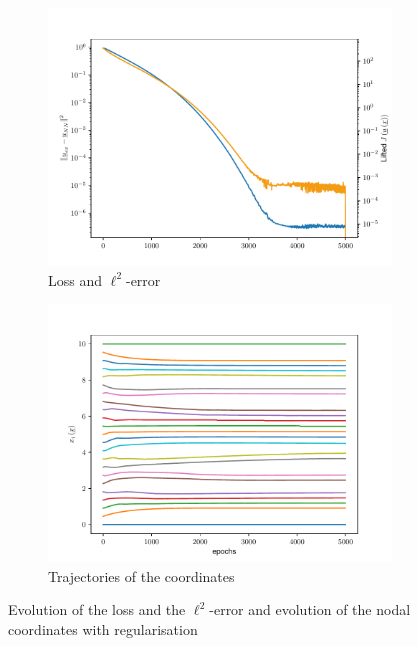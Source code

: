 \begin{figure}
    \begin{subfigure}{0.5\linewidth}
        \centering
        \includegraphics[width=\linewidth]{Figures/Loss_Comaprison_Regul64.pdf}
        \caption{Loss and $\ell^2$-error}
    \end{subfigure}
    \begin{subfigure}{0.5\linewidth}
        \centering
        \includegraphics[width=\linewidth]{Figures/Trajectories_Regul64.pdf}
        \caption{Trajectories of the coordinates}
    \end{subfigure}
    \caption{Evolution of the loss and the $\ell^2$-error and evolution of the nodal coordinates with regularisation}
    \label{fig:Loss_traj_regul}
\end{figure}

